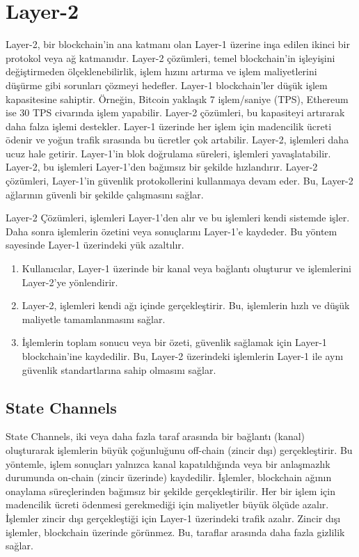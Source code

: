 \section{Layer-2}

Layer-2, bir blockchain'in ana katmanı olan Layer-1 üzerine inşa edilen ikinci bir protokol veya ağ katmanıdır. Layer-2 çözümleri, temel blockchain'in işleyişini değiştirmeden ölçeklenebilirlik, işlem hızını artırma ve işlem maliyetlerini düşürme gibi sorunları çözmeyi hedefler. Layer-1 blockchain'ler düşük işlem kapasitesine sahiptir. Örneğin, Bitcoin yaklaşık 7 işlem/saniye (TPS), Ethereum ise 30 TPS civarında işlem yapabilir. Layer-2 çözümleri, bu kapasiteyi artırarak daha falza işlemi destekler. Layer-1 üzerinde her işlem için madencilik ücreti ödenir ve yoğun trafik sırasında bu ücretler çok artabilir. Layer-2, işlemleri daha ucuz hale getirir. Layer-1'in blok doğrulama süreleri, işlemleri yavaşlatabilir. Layer-2, bu işlemleri Layer-1'den bağımsız bir şekilde hızlandırır. Layer-2 çözümleri, Layer-1'in güvenlik protokollerini kullanmaya devam eder. Bu, Layer-2 ağlarının güvenli bir şekilde çalışmasını sağlar.

Layer-2 Çözümleri, işlemleri Layer-1'den alır ve bu işlemleri kendi sistemde işler. Daha sonra işlemlerin özetini veya sonuçlarını Layer-1'e kaydeder. Bu yöntem sayesinde Layer-1 üzerindeki yük azaltılır. 

\begin{enumerate}
    \item Kullanıcılar, Layer-1 üzerinde bir kanal veya bağlantı oluşturur ve işlemlerini Layer-2'ye yönlendirir.
    \item Layer-2, işlemleri kendi ağı içinde gerçekleştirir. Bu, işlemlerin hızlı ve düşük maliyetle tamamlanmasını sağlar.
    \item İşlemlerin toplam sonucu veya bir özeti, güvenlik sağlamak için Layer-1 blockchain'ine kaydedilir. Bu, Layer-2 üzerindeki işlemlerin Layer-1 ile aynı güvenlik standartlarına sahip olmasını sağlar.
\end{enumerate}

\subsection{State Channels}

State Channels, iki veya daha fazla taraf arasında bir bağlantı (kanal) oluşturarak işlemlerin büyük çoğunluğunu off-chain (zincir dışı) gerçekleştirir. Bu yöntemle, işlem sonuçları yalnızca kanal kapatıldığında veya bir anlaşmazlık durumunda on-chain (zincir üzerinde) kaydedilir. İşlemler, blockchain ağının onaylama süreçlerinden bağımsız bir şekilde gerçekleştirilir. Her bir işlem için madencilik ücreti ödenmesi gerekmediği için maliyetler büyük ölçüde azalır. İşlemler zincir dışı gerçekleştiği için Layer-1 üzerindeki trafik azalır. Zincir dışı işlemler, blockchain üzerinde görünmez. Bu, taraflar arasında daha fazla gizlilik sağlar.

